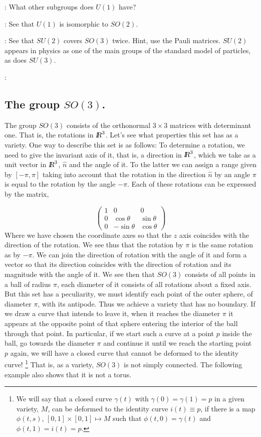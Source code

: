 \ejer: What other subgroups does $U(1)$ have?

\ejer: See that $U(1)$ is isomorphic to $SO(2)$.

\ejer: See that $SU(2)$ covers $SO(3)$ twice. Hint, use the Pauli matrices. $SU(2)$ appears in physics as one of the main groups of the standard model of particles, as does $SU(3)$.

\ejer: 

\subsection{The group $SO(3)$.}

The group $SO(3)$ consists of the orthonormal $3 \times 3$ matrices with determinant one.
That is, the rotations in $\mbox{\sl {l$\!\!\!\;\:\!$R}}^{3}$. Let's see what properties this set has as a variety.
One way to describe this set is as follows: To determine a rotation, we need to give
the invariant axis of it, that is, a direction in $\mbox{\sl {l$\!\!\!\;\:\!$R}}^{3}$, which we take as a unit vector in $\mbox{\sl {l$\!\!\!\;\:\!$R}}^{3}$, $\hat{n}$ and the angle of it. To the latter 
we can assign a range given by $[-\pi,\pi]$ taking into account that the rotation in the direction $\hat{n}$ by an angle $\pi$ is equal to the rotation by the angle $-\pi$.
Each of these rotations can be expressed by the matrix,

\[
\left( \begin{array}{ccc}
          1 & 0 & 0 \\
          0 & \cos \theta & \sin \theta \\
          0 &-\sin \theta & \cos \theta
          \end{array}
          \right)
\]          
%
Where we have chosen the coordinate axes so that the $z$ axis coincides with the direction of the rotation.
We see thus that the rotation by $\pi$ is the same rotation as by $-\pi$.
We can join the direction of rotation with the angle of it and form a vector so that its direction coincides with the direction of rotation and its magnitude with the angle of it. We see then that $SO(3)$
consists of all points in a ball of radius $\pi$, each diameter of it consists of all rotations about a fixed axis. 
But this set has a peculiarity, we must identify each point of the outer sphere, of diameter $\pi$, with its antipode. Thus we achieve a variety that has no boundary.
If we draw a curve that intends to leave it, when it reaches the diameter $\pi$ it appears at the opposite point
of that sphere entering the interior of the ball through that point.
In particular, if we start such a curve at a point $p$ inside the ball, go towards the diameter $\pi$ and continue it until we reach the starting point $p$ again, we will have a closed curve that cannot be deformed to the identity curve! \footnote{We will say that a closed curve $\gamma(t)$ with $\gamma(0)=\gamma(1)=p$ in a given variety, $M$, can be deformed to the identity curve $i(t)\equiv p$, if there is a map $\phi(t,s)$, $[0,1]\times [0,1] \mapsto M$ such that $\phi(t,0)=\gamma(t)$ and $\phi(t,1)=i(t)=p$.} That is, as a variety, $SO(3)$ is not simply connected. The following example also shows that it is not a torus.

